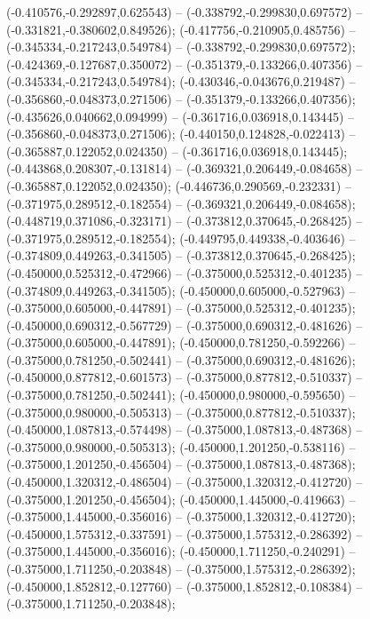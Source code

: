  (-0.410576,-0.292897,0.625543) -- (-0.338792,-0.299830,0.697572) -- (-0.331821,-0.380602,0.849526);
 (-0.417756,-0.210905,0.485756) -- (-0.345334,-0.217243,0.549784) -- (-0.338792,-0.299830,0.697572);
 (-0.424369,-0.127687,0.350072) -- (-0.351379,-0.133266,0.407356) -- (-0.345334,-0.217243,0.549784);
 (-0.430346,-0.043676,0.219487) -- (-0.356860,-0.048373,0.271506) -- (-0.351379,-0.133266,0.407356);
 (-0.435626,0.040662,0.094999) -- (-0.361716,0.036918,0.143445) -- (-0.356860,-0.048373,0.271506);
 (-0.440150,0.124828,-0.022413) -- (-0.365887,0.122052,0.024350) -- (-0.361716,0.036918,0.143445);
 (-0.443868,0.208307,-0.131814) -- (-0.369321,0.206449,-0.084658) -- (-0.365887,0.122052,0.024350);
 (-0.446736,0.290569,-0.232331) -- (-0.371975,0.289512,-0.182554) -- (-0.369321,0.206449,-0.084658);
 (-0.448719,0.371086,-0.323171) -- (-0.373812,0.370645,-0.268425) -- (-0.371975,0.289512,-0.182554);
 (-0.449795,0.449338,-0.403646) -- (-0.374809,0.449263,-0.341505) -- (-0.373812,0.370645,-0.268425);
 (-0.450000,0.525312,-0.472966) -- (-0.375000,0.525312,-0.401235) -- (-0.374809,0.449263,-0.341505);
 (-0.450000,0.605000,-0.527963) -- (-0.375000,0.605000,-0.447891) -- (-0.375000,0.525312,-0.401235);
 (-0.450000,0.690312,-0.567729) -- (-0.375000,0.690312,-0.481626) -- (-0.375000,0.605000,-0.447891);
 (-0.450000,0.781250,-0.592266) -- (-0.375000,0.781250,-0.502441) -- (-0.375000,0.690312,-0.481626);
 (-0.450000,0.877812,-0.601573) -- (-0.375000,0.877812,-0.510337) -- (-0.375000,0.781250,-0.502441);
 (-0.450000,0.980000,-0.595650) -- (-0.375000,0.980000,-0.505313) -- (-0.375000,0.877812,-0.510337);
 (-0.450000,1.087813,-0.574498) -- (-0.375000,1.087813,-0.487368) -- (-0.375000,0.980000,-0.505313);
 (-0.450000,1.201250,-0.538116) -- (-0.375000,1.201250,-0.456504) -- (-0.375000,1.087813,-0.487368);
 (-0.450000,1.320312,-0.486504) -- (-0.375000,1.320312,-0.412720) -- (-0.375000,1.201250,-0.456504);
 (-0.450000,1.445000,-0.419663) -- (-0.375000,1.445000,-0.356016) -- (-0.375000,1.320312,-0.412720);
 (-0.450000,1.575312,-0.337591) -- (-0.375000,1.575312,-0.286392) -- (-0.375000,1.445000,-0.356016);
 (-0.450000,1.711250,-0.240291) -- (-0.375000,1.711250,-0.203848) -- (-0.375000,1.575312,-0.286392);
 (-0.450000,1.852812,-0.127760) -- (-0.375000,1.852812,-0.108384) -- (-0.375000,1.711250,-0.203848);
